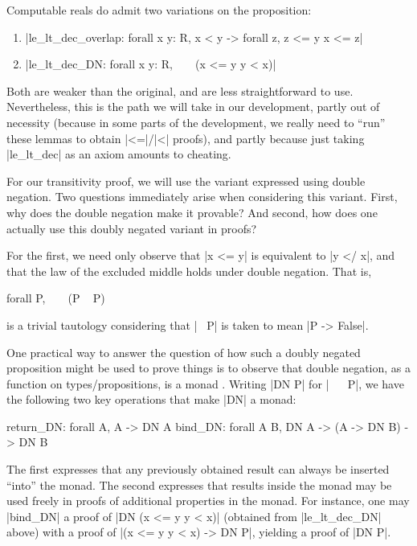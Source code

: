 \documentclass[runningheads]{llncs}
\begin{document}
Computable reals do admit two variations on the proposition:
\begin{enumerate}
\item |le_lt_dec_overlap: forall x y: R, x < y -> forall z, z <= y \/ x <= z|
\item |le_lt_dec_DN: forall x y: R, ~ ~ (x <= y \/ y < x)|
\end{enumerate}

Both are weaker than the original, and are less straightforward to use. Nevertheless, this is the path we will take in our development, partly out of necessity (because in some parts of the development, we really need to ``run'' these lemmas to obtain |<=|/|<| proofs), and partly because just taking |le_lt_dec| as an axiom amounts to cheating. 

For our transitivity proof, we will use the variant expressed using double negation. Two questions immediately arise when considering this variant. First, why does the double negation make it provable? And second, how does one actually use this doubly negated variant in proofs?

For the first, we need only observe that |x <= y| is equivalent to |y </ x|, and that the law of the excluded middle holds under double negation. That is,
\begin{code}
  forall P, ~ ~ (P \/ ~ P)
\end{code}
is a trivial tautology considering that |~ P| is taken to mean |P -> False|.

One practical way to answer the question of how such a doubly negated proposition might be used to prove things is to observe that double negation, as a function on types/propositions, is a monad \cite{wadler95monads}. Writing |DN P| for |~ ~ P|, we have the following two key operations that make |DN| a monad:


\begin{code}
  return_DN: forall A, A -> DN A
  bind_DN: forall A B, DN A -> (A -> DN B) -> DN B
\end{code}
The first expresses that any previously obtained result can always be inserted ``into'' the monad. The second expresses that results inside the monad may be used freely in proofs of additional properties in the monad. For instance, one may |bind_DN| a proof of |DN (x <= y \/ y < x)| (obtained from |le_lt_dec_DN| above) with a proof of |(x <= y \/ y < x) -> DN P|, yielding a proof of |DN P|.
\end{document}
